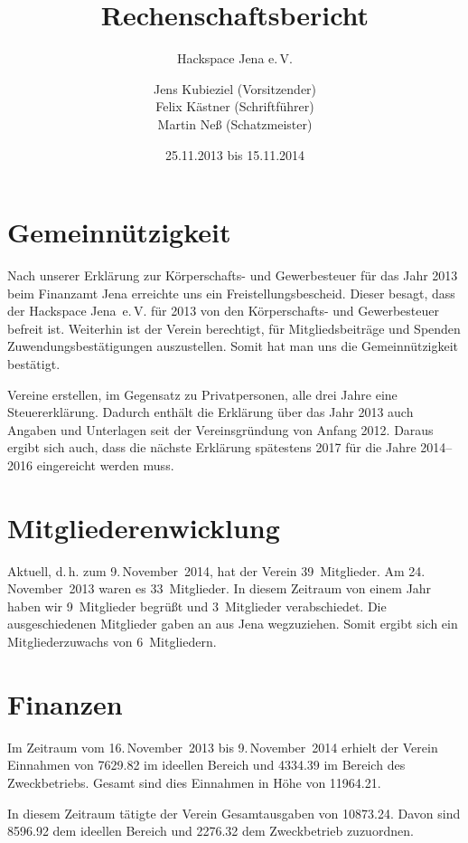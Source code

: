 \documentclass[ngerman]{scrartcl}
\title{Rechenschaftsbericht}
\subtitle{Hackspace Jena e.\,V.}
\author{%
	Jens Kubieziel (Vorsitzender)\\
    Felix Kästner (Schriftführer)\\
	Martin Neß (Schatzmeister)
}
\date{25.11.2013 bis 15.11.2014}
\begin{document}
\maketitle{}

\tableofcontents{}

\newpage{}

\section{Gemeinnützigkeit}

Nach unserer Erklärung zur Körperschafts- und Gewerbesteuer für das Jahr 2013 beim Finanzamt Jena
erreichte uns ein Freistellungsbescheid.
Dieser besagt, dass der Hackspace Jena~e.\,V. für 2013 von den Körperschafts- und Gewerbesteuer befreit ist. Weiterhin ist der Verein berechtigt, für Mitgliedsbeiträge und Spenden Zuwendungsbestätigungen auszustellen.
Somit hat man uns die Gemeinnützigkeit bestätigt.

Vereine erstellen, im Gegensatz zu Privatpersonen, alle drei Jahre eine Steuererklärung.
Dadurch enthält die Erklärung über das Jahr 2013 auch Angaben und Unterlagen seit der Vereinsgründung von Anfang 2012.
Daraus ergibt sich auch, dass die nächste Erklärung spätestens 2017 für die Jahre 2014--2016 eingereicht werden muss.

\section{Mitgliederenwicklung}

Aktuell, d.\,h. zum 9.\,November~2014, hat der Verein 39~Mitglieder. Am 24.\,November~2013 waren es 33~Mitglieder.
In diesem Zeitraum von einem Jahr haben wir 9~Mitglieder begrüßt und 3~Mitglieder verabschiedet. Die ausgeschiedenen Mitglieder gaben an aus Jena wegzuziehen.
Somit ergibt sich ein Mitgliederzuwachs von 6~Mitgliedern.

\section{Finanzen}

Im Zeitraum vom 16.\,November~2013 bis 9.\,November~2014 erhielt der Verein Einnahmen von \SI{7629,82}{\EUR} im ideellen Bereich und \SI{4334,39}{\EUR} im Bereich des Zweckbetriebs.
Gesamt sind dies Einnahmen in Höhe von \SI{11964,21}{\EUR}.


In diesem Zeitraum tätigte der Verein Gesamtausgaben von \SI{10873,24}{\EUR}. Davon sind \SI{8596,92}{\EUR} dem ideellen Bereich und \SI{2276,32}{\EUR}  dem Zweckbetrieb zuzuordnen.
\end{document}
